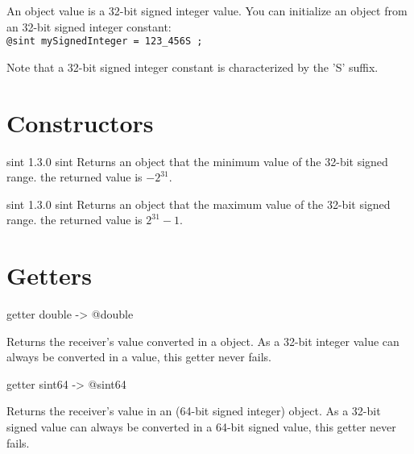

An  object value is a 32-bit signed integer value. You can initialize an  object from an 32-bit signed integer constant:\\

\texttt{@sint mySignedInteger = 123\_456S ;}

Note that a 32-bit signed integer constant is characterized by the 'S' suffix.


\section{Constructors}

{sint}
{1.3.0}
{sint}
{Returns an  object that the minimum value of the 32-bit signed range.}
{the returned value is $-2^{31}$.}





{sint}
{1.3.0}
{sint}
{Returns an  object that the maximum value of the 32-bit signed range.}
{the returned value is $2^{31}-1$.}



\section{Getters}


\begin{galgascode}
getter double -> @double
\end{galgascode}

Returns the receiver's value converted in a  object. As a 32-bit integer value can always be converted in a  value, this getter never fails.






\begin{galgascode}
getter sint64 -> @sint64
\end{galgascode}

Returns the receiver's value in an  (64-bit signed integer) object. As a 32-bit signed value can always be converted in a 64-bit signed value, this getter never fails.


